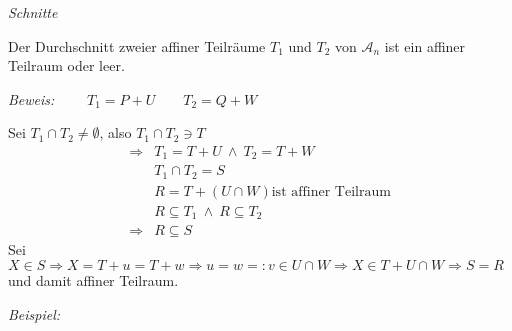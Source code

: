 \begin{mysatz} \label{Schnitte} \textit{Schnitte}\medskip

    Der Durchschnitt zweier affiner Teilräume $T_1$ und $T_2$ von $\mathcal{A}_n$ ist ein affiner Teilraum oder leer.\medskip

    \textit{Beweis:} $\qquad T_1 = P + U \qquad T_2 = Q + W$

    Sei $T_1 \cap T_2 \neq \emptyset$, also $T_1 \cap T_2 \ni T$
    \begin{align*}
        \Rightarrow & T_1 = T + U \ \wedge \ T_2 = T + W\\
        & T_1 \cap T_2 = S\\
        & R = T + \left( U \cap W \right) \text{ist affiner Teilraum}\\
        & R \subseteq T_1 \ \wedge \ R \subseteq T_2\\
        \Rightarrow & R \subseteq S
    \end{align*}
    Sei $X \in S \Rightarrow X = T + u = T + w \Rightarrow u = w =: v \in U \cap W \Rightarrow X \in T + U \cap W \Rightarrow S = R$ und damit affiner Teilraum.
\end{mysatz}

\textit{Beispiel:}

